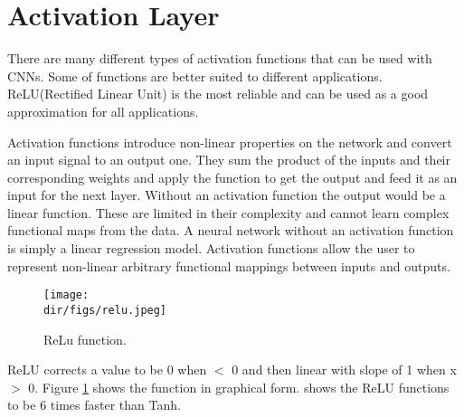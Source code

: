\section{Activation Layer}
There are many different types of activation functions that can be used with CNNs. Some of functions are better suited to different applications. ReLU(Rectified Linear Unit) is the most reliable and can be used as a good approximation for all applications. \par
Activation functions introduce non-linear properties on the network and convert an input signal to an output one. They sum the product of the inputs and their corresponding weights and apply the function to get the output and feed it as an input for the next layer. Without an activation function the output would be a linear function. These are limited in their complexity and cannot learn complex functional maps from the data. A neural network without an activation function is simply a linear regression model. Activation functions allow the user to represent non-linear arbitrary functional mappings between inputs and outputs. \par
\begin{figure}[htbp]
    \centering
    \texttt{[image: \\dir/figs/relu.jpeg]}
    \caption{ReLu function.}
    \label{fig.relu}
\end{figure}
ReLU corrects a value to be 0 when $<$ 0 and then linear with slope of 1 when x $>$ 0. Figure \ref{fig.relu} shows the function in graphical form. \citet{krizhevsky17} shows the ReLU functions to be 6 times faster than Tanh. 
